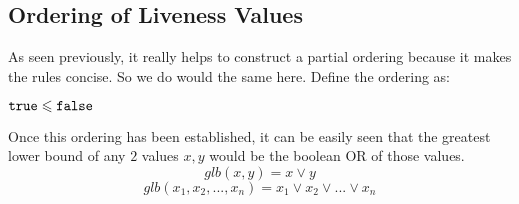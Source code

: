 \subsection{Ordering of Liveness Values}
As seen previously, it really helps to construct a partial ordering because it makes the rules concise. So we do would the same here. Define the ordering as:

\begin{center}
    ${\tt true} \leqslant {\tt false}$
\end{center}

Once this ordering has been established, it can be easily seen that the greatest lower bound of any $2$ values $x, y$ would be the boolean OR of those values.
$$glb(x,y) = x \vee y$$
$$glb(x_1,x_2,...,x_n) = x_1 \vee x_2 \vee ... \vee x_n$$

